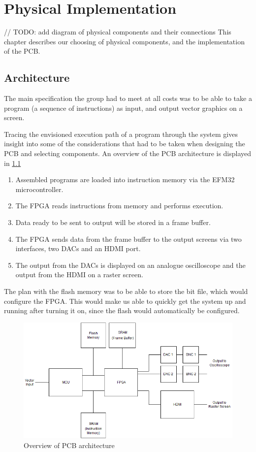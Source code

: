 \chapter{Physical Implementation}

// TODO: add diagram of physical components and their connections
This chapter describes our choosing of physical components, and the implementation of the PCB.

\section{Architecture}
The main specification the group had to meet at all costs was to be able to take a program (a sequence of instructions) as input, and output vector graphics on a screen.

Tracing the envisioned execution path of a program through the system gives insight into some of the considerations that had to be taken when designing the PCB and selecting components. An overview of the PCB architecture is displayed in \ref{fig:PCB_Overview}

\begin{enumerate}
\item Assembled \vthreek programs are loaded into instruction memory via the EFM32 microcontroller.
\item The FPGA reads instructions from memory and performs execution.
\item Data ready to be sent to output will be stored in a frame buffer.
\item The FPGA sends data from the frame buffer to the output screens via two interfaces, two DACs and an HDMI port.
\item The output from the DACs is displayed on an analogue oscilloscope and the output from the HDMI on a raster screen.
\end{enumerate}

The plan with the flash memory was to be able to store the bit file, which would configure the FPGA. This would make us able to quickly get the system up and running after turning it on, since the flash would automatically be configured.

\begin{figure}[h!]
\centering
\includegraphics[scale = 0.4]{images/PCB_Overview.png}
\caption{Overview of PCB architecture}
\label{fig:PCB_Overview}
\end{figure}

